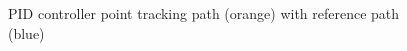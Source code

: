 \begin{figure}[p]
    \centering
    \caption{PID controller point tracking path (orange) with reference path (blue)}
    \label{fig:pid_point_track}
\end{figure}

